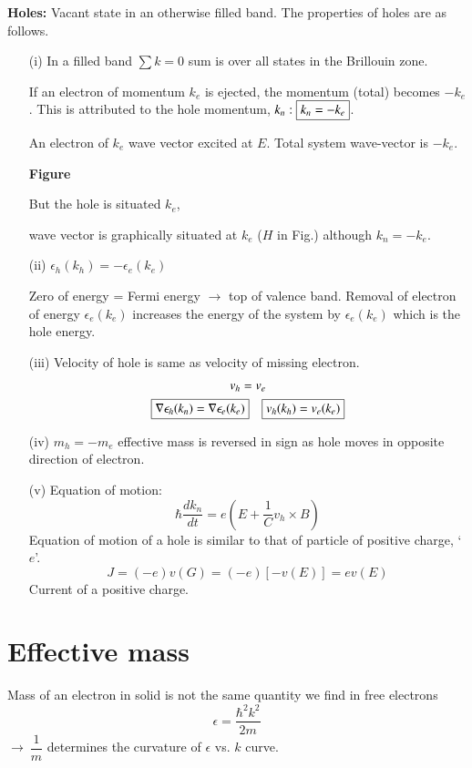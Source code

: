 \noindent
{\bf Holes:} Vacant state in an otherwise filled band. The properties of holes are as follows.
\begin{itemize}
\item[(i)] In a filled band $\sum k=0$ sum is over all states in the Brillouin zone.

If an electron of momentum $k_{e}$ is ejected, the momentum (total) becomes $-k_{e}$. This is attributed to the hole momentum, $k_{n}:\fbox{$k_{n}=-k_{e}$}$.

An electron of $k_{e}$ wave vector excited at $E$. Total system wave-vector is $-k_{e}$.
\begin{center}
{\bf Figure}
\end{center}

But the hole is situated $k_{e}$,

wave vector is graphically situated at $k_{e}$ ($H$ in Fig.) although $k_{n}=-k_{e}$.

\item[(ii)] $\epsilon_{h}(k_{h})=-\epsilon_{e}(k_{e})$

Zero of energy = Fermi energy $\to$ top of valence band. Removal of electron of energy $\epsilon_{e}(k_{e})$ increases the energy of the system by $\epsilon_{e}(k_{e})$ which is the hole energy.

\item[(iii)] Velocity of hole is same as velocity of missing electron.
\begin{gather*}
v_{h}=v_{e}\\
\fbox{$\nabla \epsilon_{h}(k_{n})=\nabla \epsilon_{e}(k_{e})$}\quad\fbox{$v_{h}(k_{h})=v_{e}(k_{e})$}
\end{gather*}

\item[(iv)] $m_{h}=-m_{e}$ effective mass is reversed in sign as hole moves in opposite direction of electron.

\item[(v)] Equation of motion:
$$
\hbar \dfrac{dk_{n}}{dt}=e\left(E+\dfrac{1}{C}v_{h}\times B\right)
$$
Equation of motion of a hole is similar to that of particle of positive charge, `$e$'.
$$
J=(-e)v(G)=(-e)[-v(E)]=ev(E)
$$
Current of a positive charge.
\end{itemize}

\section*{Effective mass}

Mass of an electron in solid is not the same quantity we find in free electrons
$$
\epsilon=\dfrac{\hbar^{2}k^{2}}{2m}
$$
$\to \ \dfrac{1}{m}$ determines the curvature of $\epsilon$ vs. $k$ curve.

